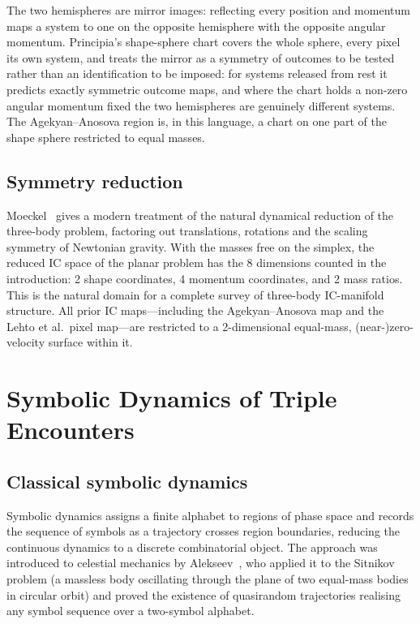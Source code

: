 \documentclass[11pt,a4paper]{article}
\begin{document}
The two hemispheres are mirror images: reflecting every position and momentum maps a system to
one on the opposite hemisphere with the opposite angular momentum.  Principia's shape-sphere
chart covers the whole sphere, every pixel its own system, and treats the mirror as a symmetry of
outcomes to be tested rather than an identification to be imposed: for systems released from
rest it predicts exactly symmetric outcome maps, and where the chart holds a non-zero angular
momentum fixed the two hemispheres are genuinely different systems.  The Agekyan--Anosova region
is, in this language, a chart on one part of the shape sphere restricted to equal masses.

\subsection{Symmetry reduction}

Moeckel~\cite{moeckel2023} gives a modern treatment of the natural dynamical reduction of the
three-body problem, factoring out translations, rotations and the scaling symmetry of Newtonian
gravity.  With the masses free on the simplex, the reduced IC space of the planar problem has the
8 dimensions counted in the introduction: 2 shape coordinates, 4 momentum coordinates, and 2 mass
ratios.  This is the natural domain for a complete survey of three-body IC-manifold structure.
All prior IC maps---including the Agekyan--Anosova map and the Lehto et al.\ pixel map---are
restricted to a 2-dimensional equal-mass, (near-)zero-velocity surface within it.

\section{Symbolic Dynamics of Triple Encounters}
\label{sec:symbolic}

\subsection{Classical symbolic dynamics}
\label{sec:classical_symbolic}

Symbolic dynamics assigns a finite alphabet to regions of phase space and records the sequence of
symbols as a trajectory crosses region boundaries, reducing the continuous dynamics to a discrete
combinatorial object.  The approach was introduced to celestial mechanics by
Alekseev~\cite{alekseev1969}, who applied it to the Sitnikov problem (a massless body oscillating
through the plane of two equal-mass bodies in circular orbit) and proved the existence of
quasirandom trajectories realising any symbol sequence over a two-symbol alphabet.
\end{document}
